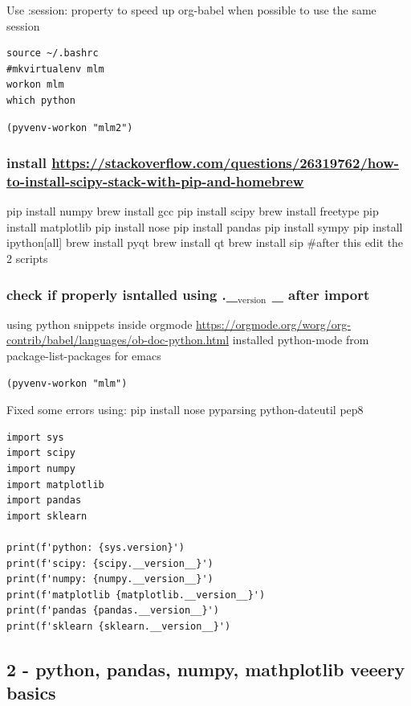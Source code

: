 \documentclass[11pt]{article}
\begin{document}
Use :session: property to speed up org-babel when possible to use the same session
\begin{verbatim}
source ~/.bashrc
#mkvirtualenv mlm
workon mlm
which python
\end{verbatim}

\begin{verbatim}
(pyvenv-workon "mlm2")
\end{verbatim}

\subsubsection{install \url{https://stackoverflow.com/questions/26319762/how-to-install-scipy-stack-with-pip-and-homebrew}}
\label{sec:orge42f5a3}
pip install numpy
brew install gcc
pip install scipy
brew install freetype
pip install matplotlib
pip install nose
pip install pandas
pip install sympy
pip install ipython[all]
brew install pyqt
brew install qt
brew install sip
\#after this edit the 2 scripts
\subsubsection{check if properly isntalled using .\_\(_{\text{version}}\) \_ after import}
\label{sec:orgc8aaeaa}

using python snippets inside orgmode \url{https://orgmode.org/worg/org-contrib/babel/languages/ob-doc-python.html}
installed python-mode from package-list-packages for emacs
\begin{verbatim}
(pyvenv-workon "mlm")
\end{verbatim}

Fixed some errors using: pip install nose pyparsing python-dateutil pep8
\begin{verbatim}
import sys
import scipy
import numpy
import matplotlib
import pandas
import sklearn

print(f'python: {sys.version}')
print(f'scipy: {scipy.__version__}')
print(f'numpy: {numpy.__version__}')
print(f'matplotlib {matplotlib.__version__}')
print(f'pandas {pandas.__version__}')
print(f'sklearn {sklearn.__version__}')

\end{verbatim}

\subsection{2 - python, pandas, numpy, mathplotlib veeery basics}
\label{sec:org48e0601}
\end{document}
